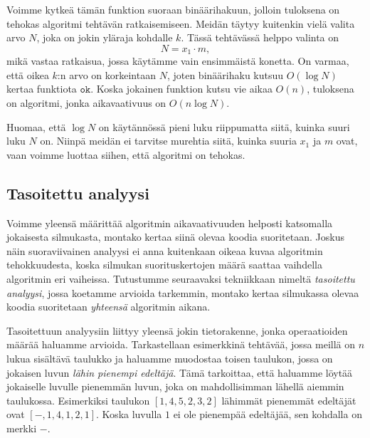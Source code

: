 Voimme kytkeä tämän funktion suoraan binäärihakuun,
jolloin tuloksena on tehokas algoritmi tehtävän ratkaisemiseen.
Meidän täytyy kuitenkin vielä valita arvo $N$,
joka on jokin yläraja kohdalle $k$.
Tässä tehtävässä helppo valinta on
\[N = x_1 \cdot m,\]
mikä vastaa ratkaisua, jossa käytämme vain ensimmäistä konetta.
On varmaa, että oikea $k$:n arvo on korkeintaan $N$,
joten binäärihaku kutsuu $O(\log N)$ kertaa funktiota $\texttt{ok}$.
Koska jokainen funktion kutsu vie aikaa $O(n)$,
tuloksena on algoritmi, jonka aikavaativuus on $O(n \log N)$.

Huomaa, että $\log N$ on käytännössä pieni luku riippumatta
siitä, kuinka suuri luku $N$ on.
Niinpä meidän ei tarvitse murehtia siitä,
kuinka suuria $x_1$ ja $m$ ovat,
vaan voimme luottaa siihen, että algoritmi on tehokas.

\subsection{Tasoitettu analyysi}

Voimme yleensä määrittää algoritmin aikavaativuuden
helposti katsomalla jokaisesta silmukasta,
montako kertaa siinä olevaa koodia suoritetaan.
Joskus näin suoraviivainen analyysi ei anna kuitenkaan
oikeaa kuvaa algoritmin tehokkuudesta,
koska silmukan suorituskertojen määrä saattaa vaihdella
algoritmin eri vaiheissa.
Tutustumme seuraavaksi tekniikkaan nimeltä
\emph{tasoitettu analyysi}, jossa koetamme arvioida tarkemmin,
montako kertaa silmukassa olevaa koodia suoritetaan
\emph{yhteensä} algoritmin aikana.

Tasoitettuun analyysiin liittyy yleensä jokin tietorakenne,
jonka operaatioiden määrää haluamme arvioida.
Tarkastellaan esimerkkinä tehtävää,
jossa meillä on $n$ lukua sisältävä taulukko
ja haluamme muodostaa toisen taulukon,
jossa on jokaisen luvun \emph{lähin pienempi edeltäjä}.
Tämä tarkoittaa, että haluamme löytää jokaiselle luvulle
pienemmän luvun, joka on mahdollisimman lähellä aiemmin taulukossa.
Esimerkiksi taulukon $[1,4,5,2,3,2]$
lähimmät pienemmät edeltäjät ovat $[-,1,4,1,2,1]$.
Koska luvulla $1$ ei ole pienempää edeltäjää,
sen kohdalla on merkki $-$.

